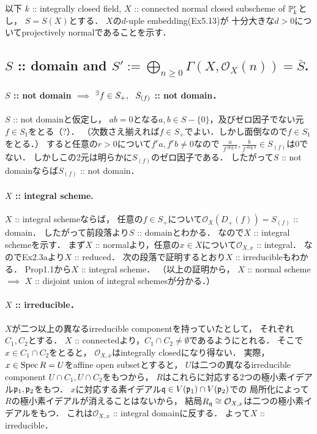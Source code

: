 \documentclass[a4paper]{jsarticle}
\newcommand{\shO}{\mathcal{O}}
\begin{document}
    以下
    $k$ :: integrally closed field,
    $X$ :: connected normal closed subscheme of $\mathbb{P}_k^r$とし，
    $S=S(X)$とする．
    $X$の$d$-uple embedding(Ex5.13)が
    十分大きな$d>0$についてprojectively normalであることを示す．

    \subsection{$S$ :: domain and $S':=\bigoplus_{n \geq 0} \Gamma(X,\shO_X(n))=\bar{S}$.}

    \paragraph{$S$ :: not domain $\implies$ ${}^{\exists} f \in S_+,~~ S_{(f)}$ :: not domain．}
    $S$ :: not domainと仮定し，
    $ab=0$となる$a,b \in S-\{0\}$，及びゼロ因子でない元$f \in S_1$をとる（?）．
    （次数さえ揃えれば$f \in S_+$でよい．しかし面倒なので$f \in S_1$をとる．）
    すると任意の$r>0$について$f^r a, f^r b \neq 0$なので
    $\frac{a}{f^{\deg a}}, \frac{b}{f^{\deg b}} \in S_{(f)}$は$0$でない．
    しかしこの2元は明らかに$S_{(f)}$のゼロ因子である．
    したがって$S$ :: not domainならば$S_{(f)}$ :: not domain．

    \paragraph{$X$ :: integral scheme.}
    $X$ :: integral schemeならば，
    任意の$f \in S_+$について$\shO_X(D_+(f))=S_{(f)}$ :: domain．
    したがって前段落より$S$ :: domainとわかる．
    なので$X$ :: integral schemeを示す．
    まず$X$ :: normalより，任意の$x \in X$について$\shO_{X,x}$ :: integral．
    なのでEx2.3aより$X$ :: reduced．
    次の段落で証明するとおり$X$ :: irreducibleもわかる．
    Prop1.1から$X$ :: integral scheme．
    （以上の証明から，
    $X$ :: normal scheme $\implies$ $X$ :: disjoint union of integral schemesが分かる．）

    \paragraph{$X$ :: irreducible．}
    $X$が二つ以上の異なるirreducible componentを持っていたとして，
    それぞれ$C_1, C_2$とする．
    $X$ :: connectedより，$C_1 \cap C_2 \neq \emptyset$であるようにとれる．
    そこで$x \in C_1 \cap C_2$をとると，
    $\shO_{X,x}$はintegrally closedになり得ない．
    実際，
    $x \in \operatorname{Spec} R=U$をaffine open subsetとすると，
    $U$は二つの異なるirreducible component $U \cap C_1, U \cap C_2$をもつから，
    $R$はこれらに対応する2つの極小素イデアル$\mathfrak{p}_1, \mathfrak{p}_2$をもつ．
    $x$に対応する素イデアル$\mathfrak{q} \in V(\mathfrak{p}_1) \cap V(\mathfrak{p}_2)$での
    局所化によって$R$の極小素イデアルが消えることはないから，
    結局$R_{\I{q}} \iso \shO_{X,x}$は二つの極小素イデアルをもつ．
    これは$\shO_{X,x}$ :: integral domainに反する．
    よって$X$ :: irreducible．
\end{document}
